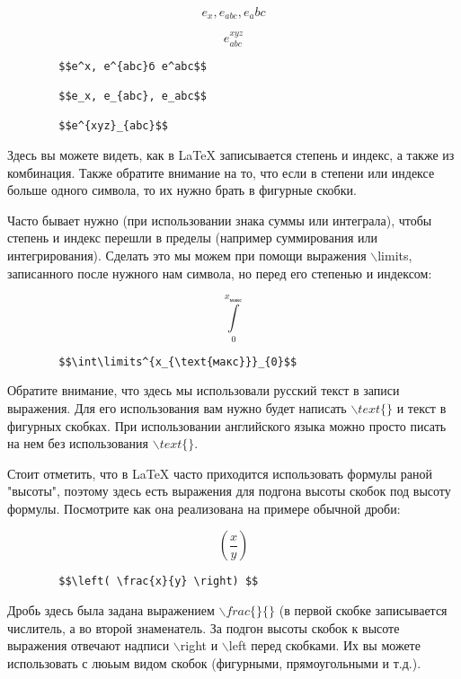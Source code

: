     $$e_x, e_{abc}, e_abc$$
    
    $$e^{xyz}_{abc}$$
    
    \begin{verbatim}
        $$e^x, e^{abc}б e^abc$$
        
        $$e_x, e_{abc}, e_abc$$
        
        $$e^{xyz}_{abc}$$
    \end{verbatim} 
    
    Здесь вы можете видеть, как в \LaTeX{} записывается степень и индекс, а также из комбинация. Также обратите внимание на то, что если в степени или индексе больше одного символа, то их нужно брать в фигурные скобки.
    
    Часто бывает нужно (при использовании знака суммы или интеграла), чтобы степень и индекс перешли в пределы (например суммирования или интегрирования). Сделать это мы можем при помощи выражения $\backslash$limits, записанного после нужного нам символа, но перед его степенью и индексом:
    
    $$\int\limits^{x_{\text{макс}}}_{0}$$
    
    \begin{verbatim}
        $$\int\limits^{x_{\text{макс}}}_{0}$$
    \end{verbatim}
    
    Обратите внимание, что здесь мы использовали русский текст в записи выражения. Для его использования вам нужно будет написать $\backslash text\{\}$ и текст в фигурных скобках. При использовании английского языка можно просто писать на нем без использования $\backslash text\{\}$.
    
    Стоит отметить, что в \LaTeX{} часто приходится использовать формулы раной "высоты", поэтому здесь есть выражения для подгона высоты скобок под высоту формулы. Посмотрите как она реализована на примере обычной дроби:
    
    $$\left( \frac{x}{y} \right) $$
    
    \begin{verbatim}
        $$\left( \frac{x}{y} \right) $$
    \end{verbatim}
    
    Дробь здесь была задана выражением $\backslash frac\{\}\{\}$ (в первой скобке записывается числитель, а во второй знаменатель. За подгон высоты скобок к высоте выражения отвечают надписи $\backslash$right и $\backslash$left перед скобками. Их вы можете использовать с люьым видом скобок (фигурными, прямоугольными и т.д.).
    
